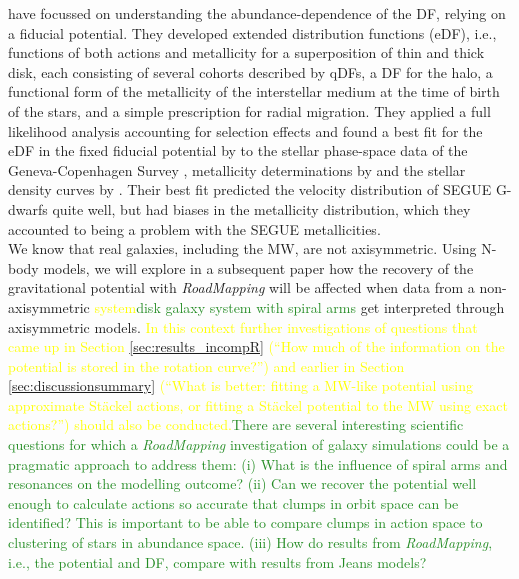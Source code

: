 \documentclass[iop,revtex4,numberedappendix,appendixfloats]{emulateapj}
\newcommand{\RM}{{\sl RoadMapping}}
\newcommand{\NEW}[1]{\textcolor{ForestGreen}{#1}}
\newcommand{\OLD}[1]{\textcolor{Yellow}{#1}}%
\begin{document}
\citet{2015MNRAS.449.3479S} have focussed on understanding the abundance-dependence of the DF, relying on a fiducial potential. They developed extended distribution functions (eDF), i.e., functions of both actions and metallicity for a superposition of thin and thick disk, each consisting of several cohorts described by qDFs, a DF for the halo, a functional form of the metallicity of the interstellar medium at the time of birth of the stars, and a simple prescription for radial migration. They applied a full likelihood analysis accounting for selection effects and found a best fit for the eDF in the fixed fiducial potential by \citet{1998MNRAS.294..429D} to the stellar phase-space data of the Geneva-Copenhagen Survey \citep{2004A&A...418..989N,2009A&A...501..941H}, metallicity determinations by \citet{2011A&A...530A.138C} and the stellar density curves by \citet{1983MNRAS.202.1025G}. Their best fit predicted the velocity distribution of SEGUE G-dwarfs \citep{2014ApJS..211...17A} quite well, but had biases in the metallicity distribution, which they accounted to being a problem with the SEGUE metallicities. \\

 We know that real galaxies, including the MW, are not axisymmetric. Using N-body models, we will explore in a subsequent paper how the recovery of the gravitational potential with \RM{} will be affected when data from a non-axisymmetric \OLD{system}\NEW{disk galaxy system with spiral arms} get interpreted through axisymmetric models. \OLD{In this context further investigations of questions that came up in Section \ref{sec:results_incompR} (``How much of the information on the potential is stored in the rotation curve?'') and earlier in Section \ref{sec:discussionsummary} (``What is better: fitting a MW-like potential using approximate St\"ackel actions, or fitting a St\"ackel potential to the MW using exact actions?'') should also be conducted.}\NEW{There are several interesting scientific questions for which a \RM{} investigation of galaxy simulations could be a pragmatic approach to address them: (i) What is the influence of spiral arms and resonances on the modelling outcome? (ii) Can we recover the potential well enough to calculate actions so accurate that clumps in orbit space can be identified? This is important to be able to compare clumps in action space to clustering of stars in abundance space. (iii) How do results from \RM{}, i.e., the potential and DF, compare with results from Jeans models?}
\end{document}
